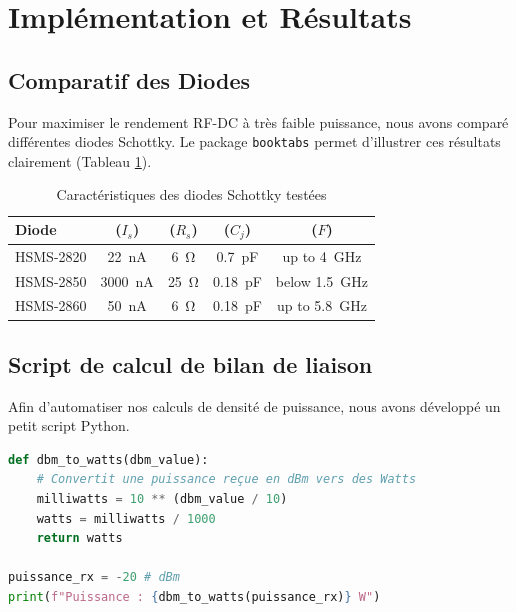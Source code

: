 \section{Implémentation et Résultats}
\label{sec:task3}

\subsection{Comparatif des Diodes}
Pour maximiser le rendement RF-DC à très faible puissance, nous avons comparé différentes diodes Schottky. Le package \texttt{booktabs} permet d'illustrer ces résultats clairement (Tableau \ref{tab:diodes}).

\begin{table}[h]
    \centering
    \caption{Caractéristiques des diodes Schottky testées}
    \label{tab:diodes}
    \begin{tabular}{lcccc}
        \toprule
        \textbf{Diode} & \textbf{($I_s$)} & \textbf{($R_s$)} & \textbf{($C_j$)} & \textbf{($F$)}\\
        \midrule
        HSMS-2820 & \SI{22}{\nano\ampere} & \SI{6}{\ohm} & \SI{0.7}{\pico\farad} & up to \SI{4}{\giga\hertz} \\
         HSMS-2850 & \SI{3000}{\nano\ampere} & \SI{25}{\ohm} & \SI{0.18}{\pico\farad} & below \SI{1.5}{\giga\hertz} \\
        HSMS-2860   & \SI{50}{\nano\ampere} & \SI{6}{\ohm} & \SI{0.18}{\pico\farad} & up to \SI{5.8}{\giga\hertz} \\
        \bottomrule
    \end{tabular}
\end{table}

\subsection{Script de calcul de bilan de liaison}
Afin d'automatiser nos calculs de densité de puissance, nous avons développé un petit script Python.

\begin{lstlisting}[language=Python, caption=Conversion dBm en Watts]
def dbm_to_watts(dbm_value):
    # Convertit une puissance reçue en dBm vers des Watts
    milliwatts = 10 ** (dbm_value / 10)
    watts = milliwatts / 1000
    return watts

puissance_rx = -20 # dBm
print(f"Puissance : {dbm_to_watts(puissance_rx)} W")
\end{lstlisting}